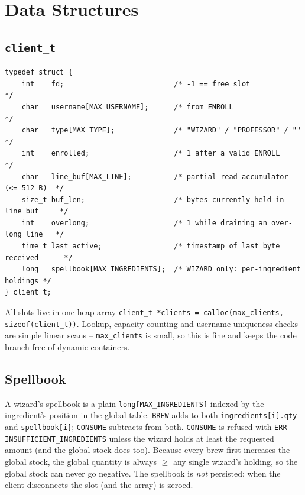 \documentclass[11pt,a4paper]{article}
\begin{document}
\begin{center}
\end{center}

\section{Data Structures}

\subsection{\texttt{client\_t}}
\begin{lstlisting}
typedef struct {
    int    fd;                          /* -1 == free slot                     */
    char   username[MAX_USERNAME];      /* from ENROLL                          */
    char   type[MAX_TYPE];              /* "WIZARD" / "PROFESSOR" / ""          */
    int    enrolled;                    /* 1 after a valid ENROLL               */
    char   line_buf[MAX_LINE];          /* partial-read accumulator (<= 512 B)  */
    size_t buf_len;                     /* bytes currently held in line_buf     */
    int    overlong;                    /* 1 while draining an over-long line   */
    time_t last_active;                 /* timestamp of last byte received      */
    long   spellbook[MAX_INGREDIENTS];  /* WIZARD only: per-ingredient holdings */
} client_t;
\end{lstlisting}
All slots live in one heap array \texttt{client\_t *clients = calloc(max\_clients,
sizeof(client\_t))}. Lookup, capacity counting and username-uniqueness checks
are simple linear scans -- \texttt{max\_clients} is small, so this is fine and
keeps the code branch-free of dynamic containers.

\subsection{Spellbook}
A wizard's spellbook is a plain \texttt{long[MAX\_INGREDIENTS]} indexed by the
ingredient's position in the global table. \texttt{BREW} adds to both
\texttt{ingredients[i].qty} and \texttt{spellbook[i]}; \texttt{CONSUME} subtracts
from both. \texttt{CONSUME} is refused with \texttt{ERR INSUFFICIENT\_INGREDIENTS}
unless the wizard holds at least the requested amount (and the global stock does
too). Because every brew first increases the global stock, the global quantity
is always $\ge$ any single wizard's holding, so the global stock can never go
negative. The spellbook is \emph{not} persisted: when the client disconnects the
slot (and the array) is zeroed.
\end{document}
